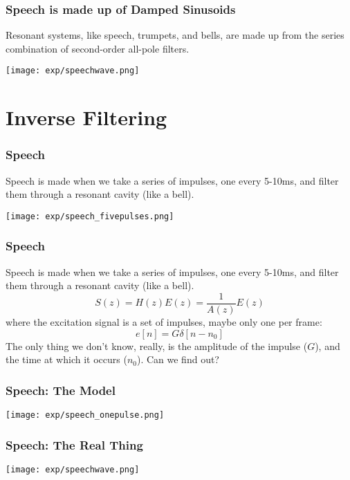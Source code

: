 \documentclass{beamer}
\begin{document}
\begin{frame}
  \frametitle{Speech is made up of Damped Sinusoids}

  Resonant systems, like speech, trumpets, and bells, are made up from
  the series combination of second-order all-pole filters.

  \centerline{\texttt{[image: exp/speechwave.png]}}
\end{frame}


\section[Second-Order]{Inverse Filtering}
\setcounter{subsection}{1}

\begin{frame}
  \frametitle{Speech}

  Speech is made when we take a series of impulses, one every 5-10ms,
  and filter them through a resonant cavity (like a bell).

  \centerline{\texttt{[image: exp/speech\_fivepulses.png]}}
\end{frame}

\begin{frame}
  \frametitle{Speech}

  Speech is made when we take a series of impulses, one every 5-10ms,
  and filter them through a resonant cavity (like a bell).
  \begin{displaymath}
    S(z) = H(z) E(z) = \frac{1}{A(z)} E(z)
  \end{displaymath}
  where the excitation signal is a set of impulses, maybe only one per frame:
  \begin{displaymath}
    e[n] = G\delta[n-n_0]
  \end{displaymath}
  The only thing we don't know, really, is the amplitude of the
  impulse ($G$), and the time at which it occurs ($n_0$).  Can we find out?
\end{frame}

\begin{frame}
  \frametitle{Speech: The Model}

  \centerline{\texttt{[image: exp/speech\_onepulse.png]}}
\end{frame}

\begin{frame}
  \frametitle{Speech: The Real Thing}

  \centerline{\texttt{[image: exp/speechwave.png]}}
\end{frame}
\end{document}
